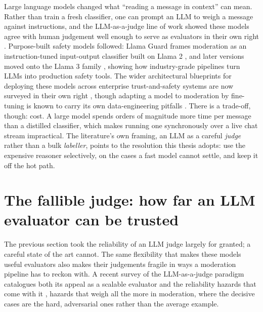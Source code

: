 Large language models changed what ``reading a message in context'' can mean. Rather than train a fresh classifier, one can prompt an LLM to weigh a message against instructions, and the LLM-as-a-judge line of work showed these models agree with human judgement well enough to serve as evaluators in their own right \citep{llmjudge2023}. Purpose-built safety models followed: Llama Guard frames moderation as an instruction-tuned input-output classifier built on Llama 2 \citep{llamaguard2023}, and later versions moved onto the Llama 3 family \citep{llama3_2024}, showing how industry-grade pipelines turn LLMs into production safety tools. The wider architectural blueprints for deploying these models across enterprise trust-and-safety systems are now surveyed in their own right \citep{platformintegrity2025}, though adapting a model to moderation by fine-tuning is known to carry its own data-engineering pitfalls \citep{adaptmoderation2023}.
There is a trade-off, though: cost. A large model spends orders of magnitude more time per message than a distilled classifier, which makes running one synchronously over a live chat stream impractical. The literature's own framing, an LLM as a careful \emph{judge} rather than a bulk \emph{labeller}, points to the resolution this thesis adopts: use the expensive reasoner selectively, on the cases a fast model cannot settle, and keep it off the hot path.
\section{The fallible judge: how far an LLM evaluator can be trusted}\label{llm-as-a-judge}

The previous section took the reliability of an LLM judge largely for granted; a careful state of the art cannot. The same flexibility that makes these models useful evaluators also makes their judgements fragile in ways a moderation pipeline has to reckon with. A recent survey of the LLM-as-a-judge paradigm catalogues both its appeal as a scalable evaluator and the reliability hazards that come with it \citep{llmjudgesurvey2025} , hazards that weigh all the more in moderation, where the decisive cases are the hard, adversarial ones rather than the average example.


